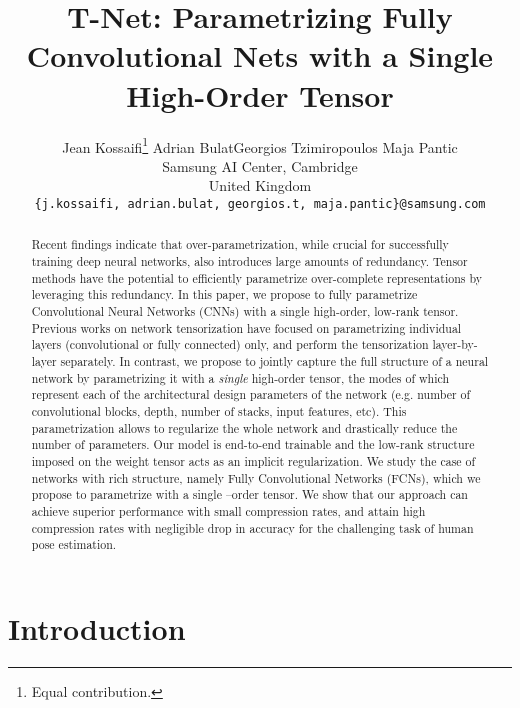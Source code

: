 \documentclass[10pt,twocolumn,letterpaper]{article}
\begin{document}
\graphicspath{{images/}}

\title{T-Net: Parametrizing Fully Convolutional Nets with a Single High-Order Tensor}


\author{Jean Kossaifi\thanks{Equal contribution.} \qquad Adrian Bulat\footnotemark[1]  \qquad Georgios Tzimiropoulos \qquad Maja Pantic
        \vspace{5pt}\\
		Samsung AI Center, Cambridge\\
		United Kingdom\\
		{\tt\small \{j.kossaifi, adrian.bulat, georgios.t, maja.pantic\}@samsung.com}
		}

\maketitle
\thispagestyle{empty}

\begin{abstract}
Recent findings indicate that over-parametrization, while crucial for successfully training deep neural networks, also introduces large amounts of redundancy. Tensor methods have the potential to efficiently parametrize over-complete representations by leveraging this redundancy. In this paper, we propose to fully parametrize Convolutional Neural Networks (CNNs) with a single high-order, low-rank tensor. Previous works on network tensorization have focused on parametrizing individual layers (convolutional or fully connected) only, and perform the tensorization layer-by-layer separately. In contrast, we propose to jointly capture the full structure of a neural network by parametrizing it with a \emph{single} high-order tensor, the modes of which represent each of the architectural design parameters of the network (e.g. number of convolutional blocks, depth, number of stacks, input features, etc). This parametrization allows to regularize the whole network and drastically reduce the number of parameters. Our model is end-to-end trainable and the low-rank structure imposed on the weight tensor acts as an implicit regularization. We study the case of networks with rich structure, namely Fully Convolutional Networks (FCNs), which we propose to parametrize with a single \myth--order tensor. We show that our approach can achieve superior performance with small compression rates, and attain high compression rates with negligible drop in accuracy for the challenging task of human pose estimation.
\end{abstract}


\section{Introduction}
\end{document}
